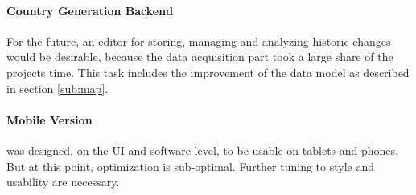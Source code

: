 \paragraph{Country Generation Backend} %
\label{sub:country_generation_backend}
For the future, an editor for storing, managing and analyzing historic changes would be desirable, because the data acquisition part took a large share of the projects time. This task includes the improvement of the data model as described in section \ref{sub:map}.

\paragraph{Mobile Version} %
\label{sub:mobile_version}
\HG was designed, on the UI and software level, to be usable on tablets and phones. But at this point, optimization is sub-optimal.
Further tuning to style and usability are necessary.

